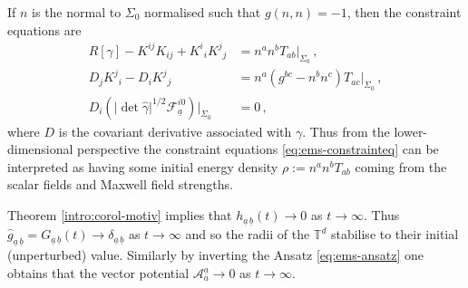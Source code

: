 \documentclass[11pt, a4paper]{amsart}
\numberwithin{equation}{section}
\numberwithin{theorem}{section}
\newcommand{\A}{\mathcal{A}}
\newcommand{\tee}{{\mathbb{T}^d}}
\newcommand{\abar}{{\underline{a}}}
\newcommand{\abbar}{{\underline{a} \, \underline{b}}}
\begin{document}
If $n$ is the normal to $\Sigma_0$ normalised such that $g(n, n) = -1$, then the constraint equations are
\begin{equation} \begin{split}
R[\gamma] - K^{ij} K_{ij} + K^i{}_i K^j{}_j &= n^a n^b T_{ab} \vert_{\Sigma_0} \,, \\
D_j K^j {}_i - D_i K^j{}_j &= n^a(g^{bc} - n^b n^c) T_{ac} \vert_{\Sigma_0} \,, \\
D_i \left( \vert \det \hat{\gamma} \vert^{1/2} \mathcal{F}^{i0}_\abar \right) \vert_{\Sigma_0} &= 0 \,,
\end{split} \label{eq:ems-constrainteq} \end{equation} 
where $D$ is the covariant derivative associated with $\gamma$. 
Thus from the lower-dimensional perspective the constraint equations \eqref{eq:ems-constrainteq} can be interpreted as having some initial energy density $\rho :=n^a n^b T_{ab}$ coming from the scalar fields and Maxwell field strengths. 

Theorem \eqref{intro:corol-motiv} implies that $h_\abbar (t) \to 0$ as $t \to \infty$. Thus $\hat{g}_\abbar = G_\abbar (t) \to \delta_\abbar$ as $t \to \infty$ and so the radii of the $\tee$ stabilise to their initial (unperturbed) value. Similarly by inverting the Ansatz \eqref{eq:ems-ansatz} one obtains that the vector potential $\A_a^\abar \to 0$ as $t\to\infty$.
\end{document}
